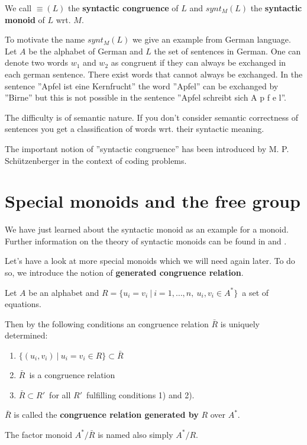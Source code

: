 We call $\equiv (L)$ the {\bf syntactic congruence} of $L$ and $synt_M(L)$ the
{\bf syntactic monoid} of $L$ wrt. $M$.

To motivate the name $synt_M(L)$ we give an example from German language. Let
$A$ be the alphabet of German and $L$ the set of sentences in German. One can
denote two words $w_1$ and $w_2$ as congruent if they can always be exchanged in
each german sentence. There exist words that cannot always be exchanged. In the
sentence ''Apfel ist eine Kernfrucht'' the word ''Apfel'' can be exchanged by
''Birne'' but this is not possible in the sentence ''Apfel schreibt sich A p f e
l''.

The difficulty is of semantic nature. If you don't consider semantic correctness
of sentences you get a classification of words wrt. their syntactic meaning.

The important notion of ''syntactic congruence'' has been introduced by M. P.
Schützenberger in the context of coding problems.

\section{Special monoids and the free group}

We have just learned about the syntactic monoid as an example for a monoid.
Further information on the theory of syntactic monoids can be found in
\cite{Saaloma} and \cite{Perrot}.

Let's have a look at more special monoids which we will need again later. To do
so, we introduce the notion of {\bf generated congruence relation}.

Let $A$ be an alphabet and $R = \{ u_i = v_i \ |\ i = 1, \ldots, n,\ u_i, v_i \in A^* \}$\ a set of equations.

Then by the following conditions an congruence relation $\bar{R}$ is uniquely
determined:

\begin{enumerate}
  \item $\{ (u_i, v_i)\ |\ u_i = v_i \in R \} \subset \bar{R}$
  \item $\bar{R}$\ is a congruence relation
  \item $\bar{R} \subset R'$\ for all $R'$\ fulfilling conditions 1) and 2).
\end{enumerate}

$\bar{R}$ is called the {\bf congruence relation generated by} $R$ over $A^*$.

The factor monoid $A^*/\bar{R}$ is named also simply $A^*/R$.

